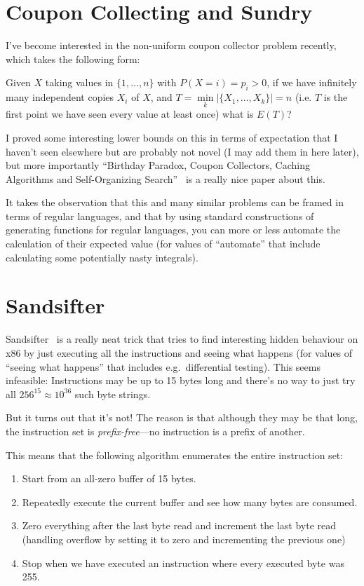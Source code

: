 \documentclass[a4paper]{book}
\begin{document}
\section{Coupon Collecting and Sundry}\label{sec:coupons}

I've become interested in the non-uniform coupon collector problem recently,
which takes the following form:

Given \(X\) taking values in \(\{1, \ldots, n\}\) with \(P(X = i) = p_i > 0\),
if we have infinitely many independent copies \(X_i\) of \(X\),
and \(T = \min\limits_k |\{X_1, \ldots, X_k\}| = n\) (i.e. \(T\) is the first point we have seen every value at least once)
what is \(E(T)\)?

I proved some interesting lower bounds on this in terms of expectation that I haven't seen elsewhere but are probably not novel (I may add them in here later),
but more importantly ``Birthday Paradox, Coupon Collectors, Caching Algorithms and Self-Organizing Search''~\cite{DBLP:journals/dam/FlajoletGT92} is a really nice paper about this.

It takes the observation that this and many similar problems can be framed in terms of regular languages,
and that by using standard constructions of generating functions for regular languages,
you can more or less automate the calculation of their expected value (for values of ``automate'' that include calculating some potentially nasty integrals).

\section{Sandsifter}

Sandsifter~\cite{sandsifter} is a really neat trick that tries to find interesting hidden behaviour on x86 by just executing all the instructions and seeing what happens
(for values of ``seeing what happens'' that includes e.g.\ differential testing).
This seems infeasible:
Instructions may be up to 15 bytes long and there's no way to just try all \(256^{15} \approx 10^{36}\) such byte strings.

But it turns out that it's not!
The reason is that although they may be that long,
the instruction set is \emph{prefix-free}---no
instruction is a prefix of another.

This means that the following algorithm enumerates the entire instruction set:

\begin{enumerate}
\item Start from an all-zero buffer of 15 bytes.
\item Repeatedly execute the current buffer and see how many bytes are consumed.
\item Zero everything after the last byte read and increment the last byte read (handling overflow by setting it to zero and incrementing the previous one)
\item Stop when we have executed an instruction where every executed byte was 255.
\end{enumerate}
\end{document}
